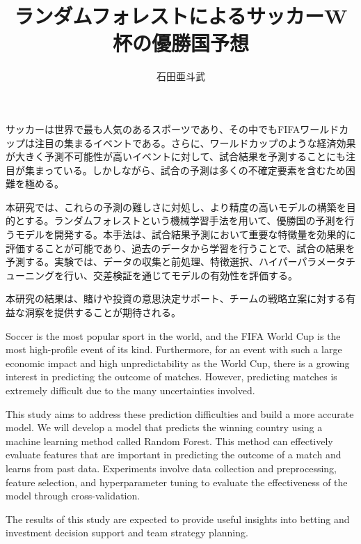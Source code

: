 \documentclass[platex]{suribt}
\title{ランダムフォレストによるサッカーW杯の優勝国予想}
\author{石田亜斗武}
\begin{document}
\maketitle%


\frontmatter%
\begin{jabstract}%
  サッカーは世界で最も人気のあるスポーツであり、その中でもFIFAワールドカップは注目の集まるイベントである。さらに、ワールドカップのような経済効果が大きく予測不可能性が高いイベントに対して、試合結果を予測することにも注目が集まっている。しかしながら、試合の予測は多くの不確定要素を含むため困難を極める。\par
  本研究では、これらの予測の難しさに対処し、より精度の高いモデルの構築を目的とする。ランダムフォレストという機械学習手法を用いて、優勝国の予測を行うモデルを開発する。本手法は、試合結果予測において重要な特徴量を効果的に評価することが可能であり、過去のデータから学習を行うことで、試合の結果を予測する。実験では、データの収集と前処理、特徴選択、ハイパーパラメータチューニングを行い、交差検証を通じてモデルの有効性を評価する。\par
  本研究の結果は、賭けや投資の意思決定サポート、チームの戦略立案に対する有益な洞察を提供することが期待される。
\end{jabstract}

\newpage

\begin{eabstract}%
  Soccer is the most popular sport in the world, and the FIFA World Cup is the most high-profile event of its kind. Furthermore, for an event with such a large economic impact and high unpredictability as the World Cup, there is a growing interest in predicting the outcome of matches. However, predicting matches is extremely difficult due to the many uncertainties involved.\par
  This study aims to address these prediction difficulties and build a more accurate model. We will develop a model that predicts the winning country using a machine learning method called Random Forest. This method can effectively evaluate features that are important in predicting the outcome of a match and learns from past data. Experiments involve data collection and preprocessing, feature selection, and hyperparameter tuning to evaluate the effectiveness of the model through cross-validation.\par
  The results of this study are expected to provide useful insights into betting and investment decision support and team strategy planning.
\end{eabstract}
\end{document}
